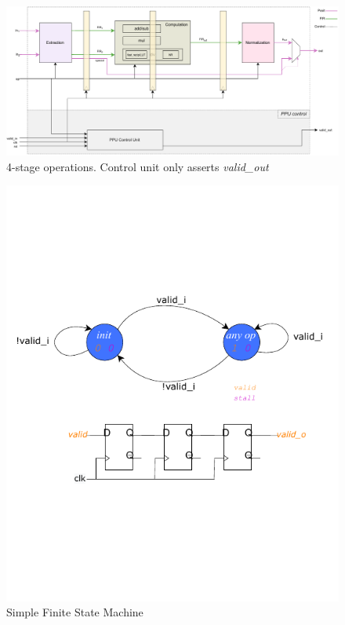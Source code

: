 \begin{figure}
    \centering
    \includegraphics[width=1\textwidth]{figures/ppu_all_with_control_unit_3b.pdf}
        \caption{4-stage operations. Control unit only asserts \textit{valid\_out}}
        \label{fig:ppu_with_control_unit2}
\end{figure}%

\begin{figure}
    \centering
    \includegraphics[width=1\textwidth]{figures/simple_fsm.pdf}
    \caption{Simple Finite State Machine}
    \label{fig:simple_fsm}
\end{figure}


